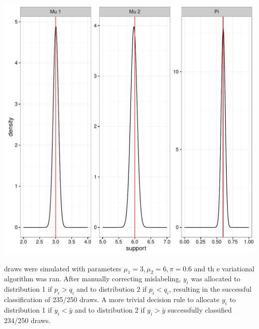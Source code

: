 \documentclass[12pt]{article}\usepackage[]{graphicx}\usepackage[]{color}
\makeatletter
\def\maxwidth{ %
  \ifdim\Gin@nat@width>\linewidth
    \linewidth
  \else
    \Gin@nat@width
  \fi
}
\newenvironment{knitrout}{}{} %
\makeatother
\begin{document}
\begin{knitrout}
\color{fgcolor}
\includegraphics[width=\maxwidth]{figure/vbayes-1} 

\end{knitrout}
250 draws were simulated with parameters $\mu_1 = 3, \mu_2 = 6, \pi=0.6$ and th e variational algorithm was ran. After manually correcting mislabeling, $y_i$ was allocated to distribution 1 if $p_i > q_i$ and to distribution 2 if $p_i < q_i$, resulting in the successful classification of 235/250 draws. A more trivial decision rule to allocate $y_i$ to distribution 1 if $y_i < \bar{y}$ and to distribution 2 if $y_i > \bar{y}$ successfully classified 234/250 draws.
\end{document}
